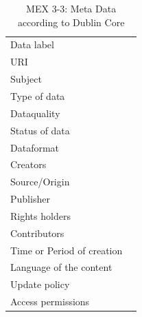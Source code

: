 \begin{table}[h!]
\caption{MEX 3-3: Meta Data according to Dublin Core}
\label{tab:}
\small
\begin{tabular}{R{3cm}|L{7cm}}
\hline
%
Data label &  \\
URI &  \\
Subject  &  \\
Type of data  &  \\
Dataquality  &  \\
Status of data  &  \\
Dataformat  & \\
Creators  &  \\
Source/Origin &  \\
Publisher  &  \\
Rights holders &  \\
Contributors &  \\
Time or Period of creation &  \\
Language of the content &  \\
Update policy &  \\
Access permissions &  \\
%
\hline
\end{tabular}
\end{table}